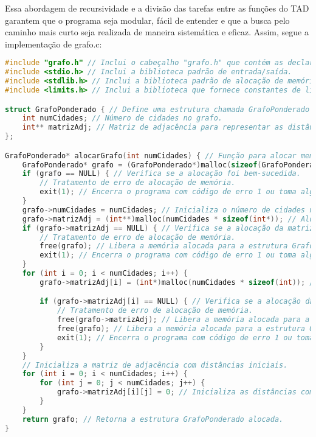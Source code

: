 \documentclass[12pt]{spieman}
\begin{document}
Essa abordagem de recursividade e a divisão das tarefas entre as funções do TAD garantem que o programa seja modular, fácil de entender e que a busca pelo caminho mais curto seja realizada de maneira sistemática e eficaz.
Assim, segue a implementação de grafo.c:
\begin{lstlisting}[language=C]
#include "grafo.h" // Inclui o cabeçalho "grafo.h" que contém as declarações de funções e estruturas.
#include <stdio.h> // Inclui a biblioteca padrão de entrada/saída.
#include <stdlib.h> // Inclui a biblioteca padrão de alocação de memória.
#include <limits.h> // Inclui a biblioteca que fornece constantes de limites, incluindo INT_MAX.

struct GrafoPonderado { // Define uma estrutura chamada GrafoPonderado para representar o grafo.
    int numCidades; // Número de cidades no grafo.
    int** matrizAdj; // Matriz de adjacência para representar as distâncias entre as cidades.
};

GrafoPonderado* alocarGrafo(int numCidades) { // Função para alocar memória para uma estrutura GrafoPonderado.
    GrafoPonderado* grafo = (GrafoPonderado*)malloc(sizeof(GrafoPonderado)); // Aloca memória para a estrutura.
    if (grafo == NULL) { // Verifica se a alocação foi bem-sucedida.
        // Tratamento de erro de alocação de memória.
        exit(1); // Encerra o programa com código de erro 1 ou toma alguma outra ação apropriada.
    }
    grafo->numCidades = numCidades; // Inicializa o número de cidades no grafo.
    grafo->matrizAdj = (int**)malloc(numCidades * sizeof(int*)); // Aloca memória para a matriz de adjacência.
    if (grafo->matrizAdj == NULL) { // Verifica se a alocação da matriz foi bem-sucedida.
        // Tratamento de erro de alocação de memória.
        free(grafo); // Libera a memória alocada para a estrutura GrafoPonderado.
        exit(1); // Encerra o programa com código de erro 1 ou toma alguma outra ação apropriada.
    }
    for (int i = 0; i < numCidades; i++) {
        grafo->matrizAdj[i] = (int*)malloc(numCidades * sizeof(int)); // Aloca memória para as distâncias entre as cidades.

        if (grafo->matrizAdj[i] == NULL) { // Verifica se a alocação das distâncias foi bem-sucedida.
            // Tratamento de erro de alocação de memória.
            free(grafo->matrizAdj); // Libera a memória alocada para a matriz de adjacência.
            free(grafo); // Libera a memória alocada para a estrutura GrafoPonderado.
            exit(1); // Encerra o programa com código de erro 1 ou toma alguma outra ação apropriada.
        }
    }
    // Inicializa a matriz de adjacência com distâncias iniciais.
    for (int i = 0; i < numCidades; i++) {
        for (int j = 0; j < numCidades; j++) {
            grafo->matrizAdj[i][j] = 0; // Inicializa as distâncias com 0.
        }
    }
    return grafo; // Retorna a estrutura GrafoPonderado alocada.
}


\end{lstlisting}
\end{document}
